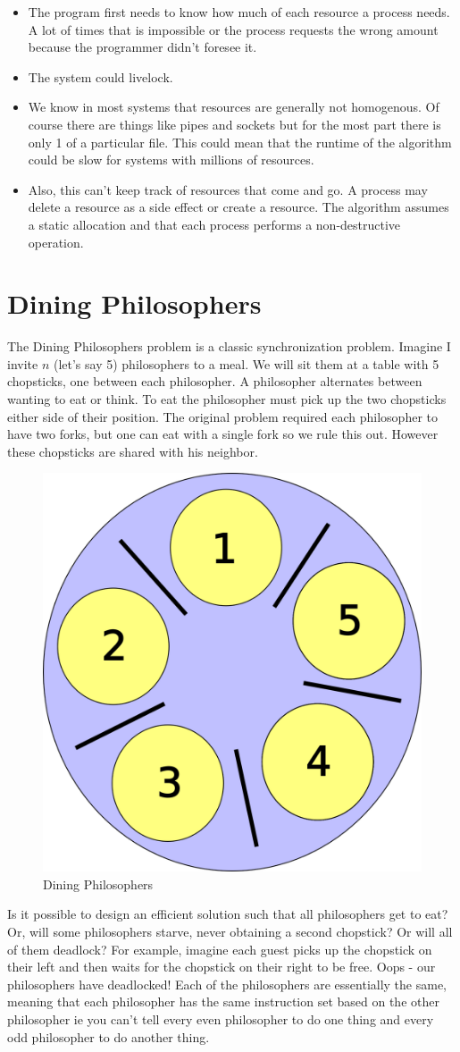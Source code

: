 \begin{itemize}
\item The program first needs to know how much of each resource a process needs. A lot of times that is impossible or the process requests the wrong amount because the programmer didn't foresee it. 
\item The system could livelock. 
\item We know in most systems that resources are generally not homogenous. Of course there are things like pipes and sockets but for the most part there is only 1 of a particular file. This could mean that the runtime of the algorithm could be slow for systems with millions of resources.
\item Also, this can't keep track of resources that come and go. A process may delete a resource as a side effect or create a resource. The algorithm assumes a static allocation and that each process performs a non-destructive operation.
\end{itemize}

\section{Dining Philosophers}

The Dining Philosophers problem is a classic synchronization problem. Imagine I invite $n$ (let's say 5) philosophers to a meal. We will sit them at a table with 5 chopsticks, one between each philosopher. A philosopher alternates between wanting to eat or think. To eat the philosopher must pick up the two chopsticks either side of their position. The original problem required each philosopher to have two forks, but one can eat with a single fork so we rule this out. However these chopsticks are shared with his neighbor.

\begin{figure}
  \begin{center}
\includegraphics[width=.2\textwidth]{deadlock/images/5DiningPhilosophers.png}
\end{center}
  \caption{Dining Philosophers}
\end{figure}

Is it possible to design an efficient solution such that all philosophers get to eat? Or, will some philosophers starve, never obtaining a second chopstick? Or will all of them deadlock? For example, imagine each guest picks up the chopstick on their left and then waits for the chopstick on their right to be free. Oops - our philosophers have deadlocked! Each of the philosophers are essentially the same, meaning that each philosopher has the same instruction set based on the other philosopher ie you can't tell every even philosopher to do one thing and every odd philosopher to do another thing.

